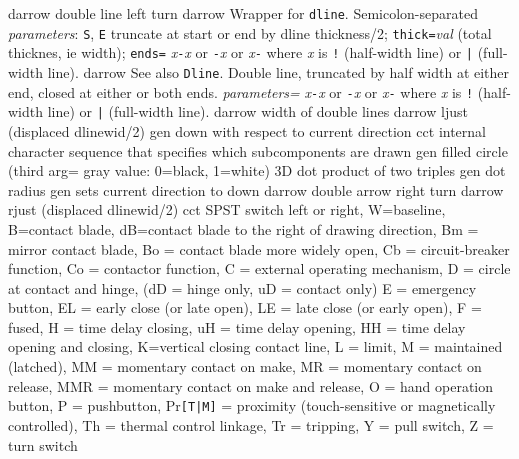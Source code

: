   {darrow}
  {double line left turn}
  {darrow}
  {Wrapper for {\tt dline}.
  Semicolon-separated {\sl parameters}:
    {\tt S}, {\tt E} truncate at start or end by dline thickness/2;
    {\tt thick=}{\sl val}   (total thicknes, ie width);
    {\tt ends=}
      {\sl x}{\tt -}{\sl x} or
      {\tt -}{\sl x} or
      {\sl x}{\tt -} where {\sl x} is {\tt !} (half-width line)
       or {\tt |} (full-width line).}
  {darrow}
  {See also {\tt Dline}.
   Double line, truncated by half width at either end, closed
    at either or both ends.
   {\sl parameters=}
      {\sl x}{\tt -}{\sl x} or
      {\tt -}{\sl x} or
      {\sl x}{\tt -} where {\sl x} is {\tt !} (half-width line)
       or {\tt |} (full-width line).}
  {darrow}
  {width of double lines}
  {darrow}
  {ljust (displaced dlinewid/2)}
  {gen}
  {down with respect to current direction}
  {cct}
  {internal character sequence that specifies which subcomponents are drawn}
  {gen}
  {filled circle (third arg= gray value: 0=black, 1=white)}
  {3D}
  {dot product of two triples}
  {gen}
  {dot radius}
  {gen}
  {sets current direction to down }
  {darrow}
  {double arrow right turn}
  {darrow}
  {rjust (displaced dlinewid/2)}
  {cct}
  {SPST switch left or right, W=baseline, B=contact blade,
    dB=contact blade to the right of drawing direction,
         Bm = mirror contact blade,
         Bo = contact blade more widely open,
         Cb = circuit-breaker function,
         Co = contactor function,
         C = external operating mechanism,
         D = circle at contact and hinge,
             (dD = hinge only, uD = contact only)
         E = emergency button,
         EL = early close (or late open),
         LE = late close (or early open),
         F = fused,
         H = time delay closing,
         uH = time delay opening,
         HH = time delay opening and closing,
         K=vertical closing contact line,
         L = limit,
         M = maintained (latched),
         MM = momentary contact on make,
         MR = momentary contact on release,
         MMR = momentary contact on make and release,
         O = hand operation button,
         P = pushbutton,
         Pr{\tt [T|M]} = proximity (touch-sensitive or magnetically controlled),
         Th = thermal control linkage,
         Tr = tripping,
         Y = pull switch,
         Z = turn switch
   }
